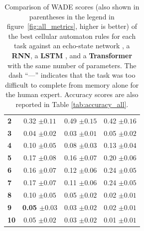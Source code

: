 \begin{table}[htbp]
\begin{tabular}{p{7cm}ccc}
      \bfseries 2 \dotfill&  0.32 ${\scriptscriptstyle \pm0.11 }$  &  0.49 ${\scriptscriptstyle \pm0.15 }$&  0.42 ${\scriptscriptstyle \pm0.16 }$ \\
      \bfseries 3 \dotfill&  0.04 ${\scriptscriptstyle \pm0.02 }$  &  0.03 ${\scriptscriptstyle \pm0.01 }$&  0.05 ${\scriptscriptstyle \pm0.02 }$ \\
      \bfseries 4 \dotfill&  0.10 ${\scriptscriptstyle \pm0.05 }$  &  0.08 ${\scriptscriptstyle \pm0.03 }$&  0.13 ${\scriptscriptstyle \pm0.04 }$ \\
      \bfseries 5 \dotfill&  0.17 ${\scriptscriptstyle \pm0.08 }$  &  0.16 ${\scriptscriptstyle \pm0.07 }$&  0.20 ${\scriptscriptstyle \pm0.06 }$ \\
      \bfseries 6 \dotfill&  0.16 ${\scriptscriptstyle \pm0.07 }$  &  0.12 ${\scriptscriptstyle \pm0.06 }$&  0.24 ${\scriptscriptstyle \pm0.05 }$ \\
      \bfseries 7 \dotfill&  0.17 ${\scriptscriptstyle \pm0.07 }$  &  0.11 ${\scriptscriptstyle \pm0.06 }$&  0.24 ${\scriptscriptstyle \pm0.05 }$ \\
      \bfseries 8 \dotfill&  0.10 ${\scriptscriptstyle \pm0.05 }$ &  0.05 ${\scriptscriptstyle \pm0.02 }$  & 0.02 ${\scriptscriptstyle \pm0.01 }$ \\
      \bfseries 9 \dotfill& \bfseries 0.05 ${\scriptscriptstyle \pm0.03 }$ &  0.03 ${\scriptscriptstyle \pm0.02 }$ &  0.02 ${\scriptscriptstyle \pm0.01 }$\\
      \bfseries 10 \dotfill&  0.05 ${\scriptscriptstyle \pm0.02 }$ &  0.03 ${\scriptscriptstyle \pm0.02 }$  &  0.01 ${\scriptscriptstyle \pm0.01 }$\\
      \bottomrule
    \end{tabular}
    \caption{Comparison of WADE scores (also shown in parentheses in the legend
      in figure~\ref{fig:all_metrics}, higher is better) of the best cellular
      automaton rules \parencite[\textbf{ReCA},
      ][]{yilmazReservoirComputingUsing2014} for each task against an echo-state
      network \parencite[\textbf{ESN},][]{jaegerEchoStateApproach2001}, a
      \textbf{RNN}, a \textbf{LSTM} \parencite{hochreiterLongShortTermMemory1997},
      and a
      \textbf{Transformer} \parencite{vaswaniAttentionAllYou2017} with the same number of parameters.
      The dash ``---'' indicates that the task was too difficult to complete from
      memory alone for the human expert. Accuracy scores are also reported in
      Table \ref{tab:accuracy_all}.}\label{tab:summary}
\end{table}

